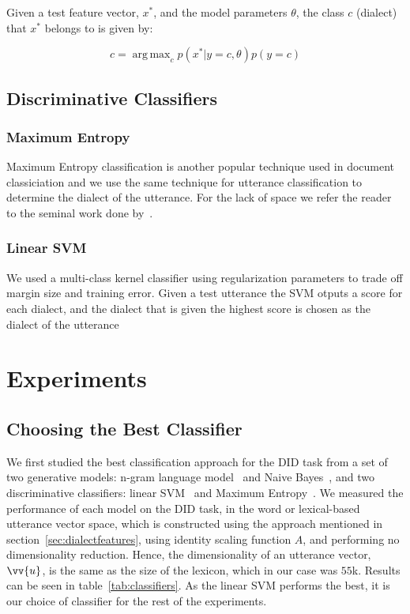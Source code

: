 \documentclass{article}
\DeclareMathOperator*{\argmax}{arg\,max}
\begin{document}
Given a test feature vector, $x^{*}$, and the model parameters $\theta$, the class $c$ (dialect) that $x^{*}$ belongs to is given by:

\begin{equation}
  c=\argmax_{c} p(x^{*}|y=c,\theta)p(y=c)
\end{equation}

\subsection{Discriminative Classifiers}
\subsubsection{Maximum Entropy}
Maximum Entropy classification is another popular technique used in document classiciation and we use the same technique for utterance classification to determine the dialect of the utterance. For the lack of space we refer the reader to the seminal work done by~\cite{Nigam}.

\subsubsection{Linear SVM}
We used a multi-class kernel classifier using regularization parameters to trade off margin size and training error. Given a test utterance the SVM otputs a score for each dialect, and the dialect that is given the highest score is chosen as the dialect of the utterance
 
\section{Experiments}
\label{sec:did}
\subsection{Choosing the Best Classifier}

We first studied the best classification approach for the DID task from a set of two generative models: n-gram language model~\cite{Collins} and Naive Bayes~\cite{Ng}, and two discriminative classifiers: linear SVM~\cite{drucker1999support} and Maximum Entropy~\cite{Nigam}.  We measured the performance of each model on the DID task, in the word or lexical-based utterance vector space, which is constructed using the approach mentioned in section~\ref{sec:dialectfeatures}, using identity scaling function $A$, and performing no dimensionality reduction. Hence, the dimensionality of an utterance vector, $\vv{u}$, is the same as the size of the lexicon, which in our case was $55$k. Results can be seen in table~\ref{tab:classifiers}.  As the linear SVM performs the best, it is our choice of classifier for the rest of the experiments.
\end{document}
